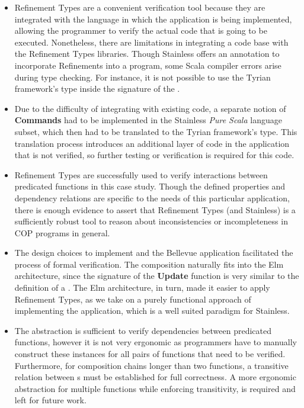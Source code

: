 \begin{itemize}
  \item
    Refinement Types are a convenient verification tool because they are integrated with the language 
    in which the application is being implemented, allowing the programmer to verify the actual code 
    that is going to be executed.
    Nonetheless, there are limitations in integrating a code base with the Refinement Types libraries. 
    Though Stainless offers an  annotation to incorporate Refinements into a program, 
    some Scala compiler errors arise during type checking.
    For instance, it is not possible to use the Tyrian framework's  type inside the 
    signature of the .

  \item
    Due to the difficulty of integrating with existing code, a separate notion of \textbf{Commands} had to 
    be implemented in the Stainless \emph{Pure Scala} language subset, which then had to be 
    translated to the Tyrian framework's  type. This translation process introduces an 
    additional layer of code in the application that is not verified, so further testing or verification is 
    required for this code.

  \item
    Refinement Types are successfully used to verify interactions between predicated functions in this 
    case study. Though the defined properties and dependency relations are specific to the needs of this 
    particular application, there is enough evidence to assert that Refinement Types (and Stainless) is a 
    sufficiently robust tool to reason about inconsistencies or incompleteness in \ac{COP} programs in 
    general.

  \item
    The design choices to implement  and the Bellevue application 
    facilitated the process of formal verification. The  composition naturally 
    fits into the Elm architecture, since the signature of the \textbf{Update} function is very similar to the 
    definition of a . The Elm architecture, in turn, made it easier to apply 
    Refinement Types, as we take on a purely functional approach of implementing the application, 
    which is a well suited paradigm for Stainless.

  \item
    The  abstraction is sufficient to verify dependencies between predicated functions, 
    however it is not very ergonomic as programmers have to manually construct these instances for all 
    pairs of functions that need to be verified.
    Furthermore, for composition chains longer than two functions, a transitive relation between 
    s must be established for full correctness. A more ergonomic  
    abstraction for multiple functions while enforcing transitivity, is required and left for future work.


\end{itemize}
